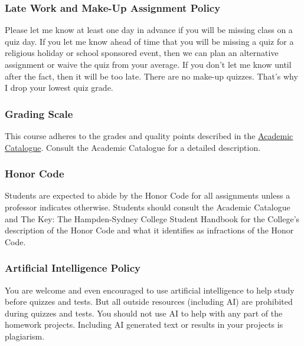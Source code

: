 \documentclass[10pt]{article}
\begin{document}
\subsubsection*{Late Work and Make-Up Assignment Policy}

Please let me know at least one day in advance if you will be missing class on a quiz day. If you let me know ahead of time that you will be missing a quiz for a religious holiday or school sponsored event, then we can plan an alternative assignment or waive the quiz from your average. If you don't let me know until after the fact, then it will be too late.  There are no make-up quizzes.  That's why I drop your lowest quiz grade. 

\subsubsection*{Grading Scale} 

This course adheres to the grades and quality points described in the \href{https://www.hsc.edu/academic-catalogues}{Academic Catalogue}. Consult the Academic Catalogue for a detailed description. 


\subsubsection*{Honor Code}

Students are expected to abide by the Honor Code for all assignments unless a professor indicates otherwise. Students should consult the Academic Catalogue and The Key: The Hampden-Sydney College Student Handbook for the College’s description of the Honor Code and what it identifies as infractions of the Honor Code.

\subsubsection*{Artificial Intelligence Policy}

You are welcome and even encouraged to use artificial intelligence to help study before quizzes and tests.   But all outside resources (including AI) are prohibited during quizzes and tests.  You should not use AI to help with any part of the homework projects. Including AI generated text or results in your projects is plagiarism.  

\end{document}
